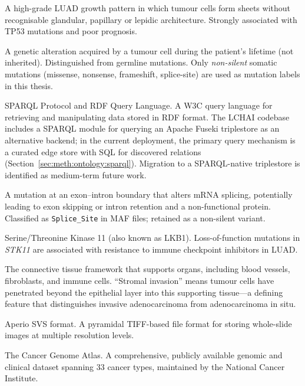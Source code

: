 \begin{description}[style=nextline,leftmargin=4cm]
\item[Solid pattern] A high-grade LUAD growth pattern in which tumour cells form sheets without recognisable glandular, papillary or lepidic architecture.  Strongly associated with TP53 mutations and poor prognosis.


\item[Somatic mutation] A genetic alteration acquired by a tumour cell during the patient's lifetime (not inherited).  Distinguished from germline mutations.  Only \emph{non-silent} somatic mutations (missense, nonsense, frameshift, splice-site) are used as mutation labels in this thesis.


\item[SPARQL] SPARQL Protocol and RDF Query Language.  A W3C query language for retrieving and manipulating data stored in RDF format.  The LCHAI codebase includes a SPARQL module for querying an Apache Fuseki triplestore as an alternative backend; in the current deployment, the primary query mechanism is a curated edge store with SQL for discovered relations (Section~\ref{sec:meth:ontology:sparql}).  Migration to a SPARQL-native triplestore is identified as medium-term future work.


\item[Splice-site mutation] A mutation at an exon--intron boundary that alters mRNA splicing, potentially leading to exon skipping or intron retention and a non-functional protein.  Classified as \texttt{Splice\_Site} in MAF files; retained as a non-silent variant.


\item[STK11] Serine/Threonine Kinase 11 (also known as LKB1).  Loss-of-function mutations in \emph{STK11} are associated with resistance to immune checkpoint inhibitors in LUAD.


\item[Stroma / stromal] The connective tissue framework that supports organs, including blood vessels, fibroblasts, and immune cells.  ``Stromal invasion'' means tumour cells have penetrated beyond the epithelial layer into this supporting tissue---a defining feature that distinguishes invasive adenocarcinoma from adenocarcinoma in situ.


\item[SVS] Aperio SVS format.  A pyramidal TIFF-based file format for storing whole-slide images at multiple resolution levels.


\item[TCGA] The Cancer Genome Atlas.  A comprehensive, publicly available genomic and clinical dataset spanning 33 cancer types, maintained by the National Cancer Institute.



\end{description}
